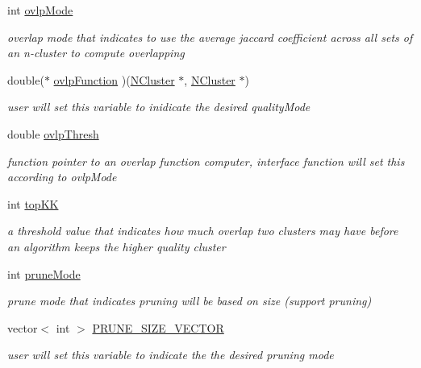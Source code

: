 \begin{DoxyCompactItemize}
int \hyperlink{class_lattice_algos_a7a9a7568a564e929c494c7c94ed5dda5}{ovlpMode}
\begin{DoxyCompactList}\small\item\em overlap mode that indicates to use the average jaccard coefficient across all sets of an n-\/cluster to compute overlapping \item\end{DoxyCompactList}\item 
double($\ast$ \hyperlink{class_lattice_algos_ad2bd9f8cb22cb27dfe527dd2bc38ec2d}{ovlpFunction} )(\hyperlink{class_n_cluster}{NCluster} $\ast$, \hyperlink{class_n_cluster}{NCluster} $\ast$)
\begin{DoxyCompactList}\small\item\em user will set this variable to inidicate the desired qualityMode \item\end{DoxyCompactList}\item 
double \hyperlink{class_lattice_algos_ae50e2eab1478e1bced92b0f1f1bcdc09}{ovlpThresh}
\begin{DoxyCompactList}\small\item\em function pointer to an overlap function computer, interface function will set this according to ovlpMode \item\end{DoxyCompactList}\item 
int \hyperlink{class_lattice_algos_a90e06533d513efc4635905624283eeae}{topKK}
\begin{DoxyCompactList}\small\item\em a threshold value that indicates how much overlap two clusters may have before an algorithm keeps the higher quality cluster \item\end{DoxyCompactList}\item 
int \hyperlink{class_lattice_algos_a5a4badfea96f02f89d8943ca7fecc2ab}{pruneMode}
\begin{DoxyCompactList}\small\item\em prune mode that indicates pruning will be based on size (support pruning) \item\end{DoxyCompactList}\item 
vector$<$ int $>$ \hyperlink{class_lattice_algos_a244d9a63307846c2df232091a78a6759}{PRUNE\_\-SIZE\_\-VECTOR}
\begin{DoxyCompactList}\small\item\em user will set this variable to indicate the the desired pruning mode \item\end{DoxyCompactList}\item 

\end{DoxyCompactItemize}
